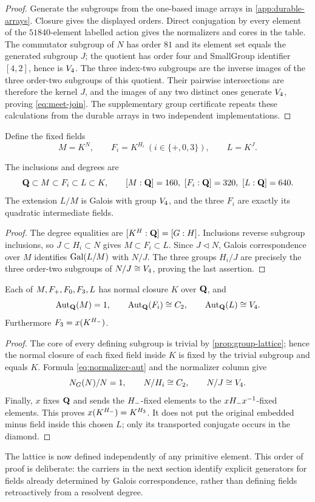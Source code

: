 \begin{proof}
Generate the subgroups from the one-based image arrays in
\cref{app:durable-arrays}.  Closure gives the displayed orders.  Direct
conjugation by every element of the $51840$-element labelled action gives the
normalizers and cores in the table.  The commutator subgroup of $N$ has order
$81$ and its element set equals the generated subgroup $J$; the quotient has
order four and SmallGroup identifier $[4,2]$, hence is $V_4$.  The three
index-two subgroups are the inverse images of the three order-two subgroups
of this quotient.  Their pairwise intersections are therefore the kernel
$J$, and the images of any two distinct ones generate $V_4$, proving
\eqref{eq:meet-join}.  The supplementary group certificate repeats these
calculations from the durable arrays in two independent implementations.
\end{proof}

Define the fixed fields
\begin{equation}
 M=K^N,\qquad F_i=K^{H_i}\ (i\in\{+,0,3\}),
 \qquad L=K^J.
 \label{eq:fixed-fields}
\end{equation}

\begin{corollary}
\label{cor:field-diamond}
The inclusions and degrees are
\[
 \mathbf{Q}\subset M\subset F_i\subset L\subset K,
 \qquad
 [M:\mathbf{Q}]=160,\ [F_i:\mathbf{Q}]=320,\ [L:\mathbf{Q}]=640.
\]
The extension $L/M$ is Galois with group $V_4$, and the three $F_i$ are
exactly its quadratic intermediate fields.
\end{corollary}

\begin{proof}
The degree equalities are $[K^H:\mathbf{Q}]=[G:H]$.  Inclusions reverse subgroup
inclusions, so $J\subset H_i\subset N$ gives $M\subset F_i\subset L$.
Since $J\triangleleft N$, Galois correspondence over $M$ identifies
$\operatorname{Gal}(L/M)$ with $N/J$.  The three groups $H_i/J$ are precisely the three
order-two subgroups of $N/J\cong V_4$, proving the last assertion.
\end{proof}

\begin{proposition}
\label{prop:closures-aut}
Each of $M,F_{+},F_{0},F_{3},L$ has normal closure $K$ over $\mathbf{Q}$, and
\[
 \operatorname{Aut}_{\mathbf{Q}}(M)=1,\qquad
 \operatorname{Aut}_{\mathbf{Q}}(F_i)\cong C_2,\qquad
 \operatorname{Aut}_{\mathbf{Q}}(L)\cong V_4.
\]
Furthermore $F_{3}=x(K^{H_{-}})$.
\end{proposition}

\begin{proof}
The core of every defining subgroup is trivial by
\cref{prop:group-lattice}; hence the normal closure of each fixed field inside
$K$ is fixed by the trivial subgroup and equals $K$.  Formula
\eqref{eq:normalizer-aut} and the normalizer column give
\[
 N_G(N)/N=1,\qquad N/H_i\cong C_2,\qquad N/J\cong V_4.
\]
Finally, $x$ fixes $\mathbf{Q}$ and sends the $H_{-}$-fixed elements to the
$xH_{-} x^{-1}$-fixed elements.  This proves
$x(K^{H_{-}})=K^{H_{3}}$.  It does not put the original embedded minus
field inside this chosen $L$; only its transported conjugate occurs in the
diamond.
\end{proof}

The lattice is now defined independently of any primitive element.  This
order of proof is deliberate: the carriers in the next section identify
explicit generators for fields already determined by Galois correspondence,
rather than defining fields retroactively from a resolvent degree.
